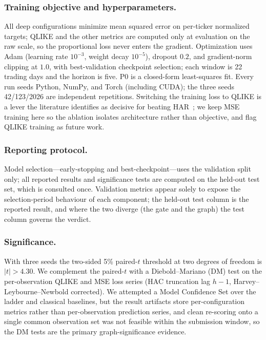 \documentclass[runningheads]{llncs}
\newcommand{\tcrit}{4.30}
\begin{document}
\subsubsection{Training objective and hyperparameters.}
All deep configurations minimize mean squared error on per-ticker normalized targets; QLIKE and the other
metrics are computed only at evaluation on the raw scale, so the proportional loss never enters the
gradient. Optimization uses Adam (learning rate $10^{-3}$, weight decay $10^{-5}$), dropout $0.2$, and
gradient-norm clipping at $1.0$, with best-validation checkpoint selection; each window is 22 trading days
and the horizon is five. P0 is a closed-form least-squares fit. Every run seeds Python, NumPy, and Torch
(including CUDA); the three seeds 42/123/2026 are independent repetitions. Switching the training loss to
QLIKE is a lever the literature identifies as decisive for beating HAR~\cite{zhang2025gnnhar}; we keep MSE
training here so the ablation isolates architecture rather than objective, and flag QLIKE training as
future work.

\subsubsection{Reporting protocol.}
Model selection---early-stopping and best-checkpoint---uses the validation split only; all reported
results and significance tests are computed on the held-out test set, which is consulted once.
Validation metrics appear solely to expose the selection-period behaviour of each component; the
held-out test column is the reported result, and where the two diverge (the gate and the graph) the
test column governs the verdict.

\subsubsection{Significance.}
With three seeds the two-sided 5\% paired-$t$ threshold at two degrees of freedom is $|t|>\tcrit$. We
complement the paired-$t$ with a Diebold--Mariano (DM) test on the per-observation QLIKE and MSE loss
series (HAC truncation lag $h-1$, Harvey--Leybourne--Newbold corrected). We attempted a Model Confidence
Set over the ladder and classical baselines, but the result artifacts store per-configuration metrics
rather than per-observation prediction series, and clean re-scoring onto a single common observation set
was not feasible within the submission window, so the DM tests are the
primary graph-significance evidence.
\end{document}
